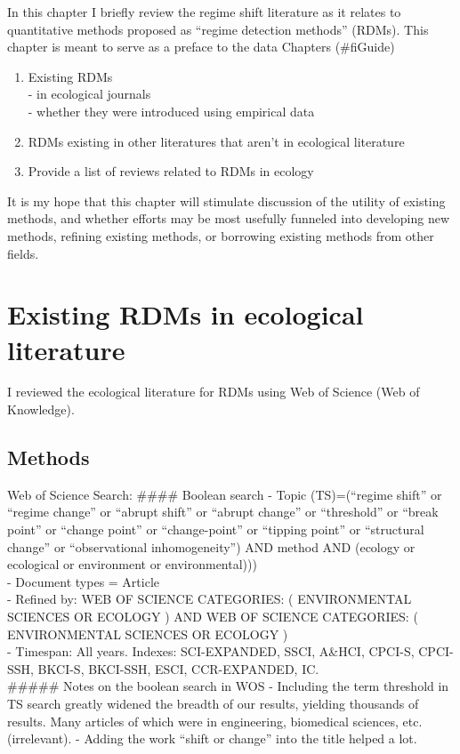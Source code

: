 \documentclass[12pt,twoside]{reedthesis}
\providecommand{\tightlist}{%
  \setlength{\itemsep}{0pt}\setlength{\parskip}{0pt}}
\def\labelenumi{\arabic{enumi}.}
\def\labelenumi{\arabic{enumi}.}
\begin{document}
In this chapter I briefly review the regime shift literature as it relates to quantitative methods proposed as ``regime detection methods'' (RDMs). This chapter is meant to serve as a preface to the data Chapters (\#fiGuide)
\begin{enumerate}
\def\labelenumi{\arabic{enumi}.}
\tightlist
\item
  Existing RDMs\\
  - in ecological journals\\
  - whether they were introduced using empirical data\\
\item
  RDMs existing in other literatures that aren't in ecological literature\\
\item
  Provide a list of reviews related to RDMs in ecology
\end{enumerate}
It is my hope that this chapter will stimulate discussion of the utility of existing methods, and whether efforts may be most usefully funneled into developing new methods, refining existing methods, or borrowing existing methods from other fields.

\hypertarget{existing-rdms-in-ecological-literature}{%
\section{Existing RDMs in ecological literature}\label{existing-rdms-in-ecological-literature}}

I reviewed the ecological literature for RDMs using Web of Science (Web of Knowledge).

\hypertarget{methods}{%
\subsection{Methods}\label{methods}}

Web of Science Search:
\#\#\#\# Boolean search
- Topic (TS)=(``regime shift'' or ``regime change'' or ``abrupt shift'' or ``abrupt change'' or ``threshold'' or ``break point'' or ``change point'' or ``change-point'' or ``tipping point'' or ``structural change'' or ``observational inhomogeneity'') AND method AND (ecology or ecological or environment or environmental)))\\
- Document types = Article\\
- Refined by: WEB OF SCIENCE CATEGORIES: ( ENVIRONMENTAL SCIENCES OR ECOLOGY ) AND WEB OF SCIENCE CATEGORIES: ( ENVIRONMENTAL SCIENCES OR ECOLOGY )\\
- Timespan: All years. Indexes: SCI-EXPANDED, SSCI, A\&HCI, CPCI-S, CPCI-SSH, BKCI-S, BKCI-SSH, ESCI, CCR-EXPANDED, IC.\\
\#\#\#\#\# Notes on the boolean search in WOS
- Including the term threshold in TS search greatly widened the breadth of our results, yielding thousands of results. Many articles of which were in engineering, biomedical sciences, etc. (irrelevant).
- Adding the work ``shift or change'' into the title helped a lot.
\end{document}

